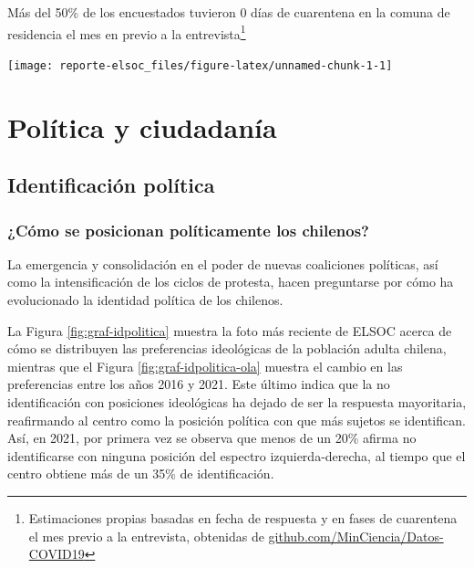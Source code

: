 \documentclass[
  12pt,
]{book}
\begin{document}
Más del 50\% de los encuestados tuvieron 0 días de cuarentena en la comuna de residencia el mes en previo a la entrevista\footnote{Estimaciones propias basadas en fecha de respuesta y en fases de cuarentena el mes previo a la entrevista, obtenidas de \href{https://github.com/MinCiencia/Datos-COVID19}{github.com/MinCiencia/Datos-COVID19}}

\begin{center}\texttt{[image: reporte-elsoc\_files/figure-latex/unnamed-chunk-1-1]} \end{center}

\hypertarget{poluxedtica-y-ciudadanuxeda}{%
\chapter{Política y ciudadanía}\label{poluxedtica-y-ciudadanuxeda}}

\hypertarget{identificaciuxf3n-poluxedtica}{%
\section{Identificación política}\label{identificaciuxf3n-poluxedtica}}

\hypertarget{cuxf3mo-se-posicionan-poluxedticamente-los-chilenos}{%
\subsection*{¿Cómo se posicionan políticamente los chilenos?}\label{cuxf3mo-se-posicionan-poluxedticamente-los-chilenos}}

La emergencia y consolidación en el poder de nuevas coaliciones políticas, así como la intensificación de los ciclos de protesta, hacen preguntarse por cómo ha evolucionado la identidad política de los chilenos.

La Figura \ref{fig:graf-idpolitica} muestra la foto más reciente de ELSOC acerca de cómo se distribuyen las preferencias ideológicas de la población adulta chilena, mientras que el Figura \ref{fig:graf-idpolitica-ola} muestra el cambio en las preferencias entre los años 2016 y 2021. Este último indica que la no identificación con posiciones ideológicas ha dejado de ser la respuesta mayoritaria, reafirmando al centro como la posición política con que más sujetos se identifican. Así, en 2021, por primera vez se observa que menos de un 20\% afirma no identificarse con ninguna posición del espectro izquierda-derecha, al tiempo que el centro obtiene más de un 35\% de identificación.
\end{document}
